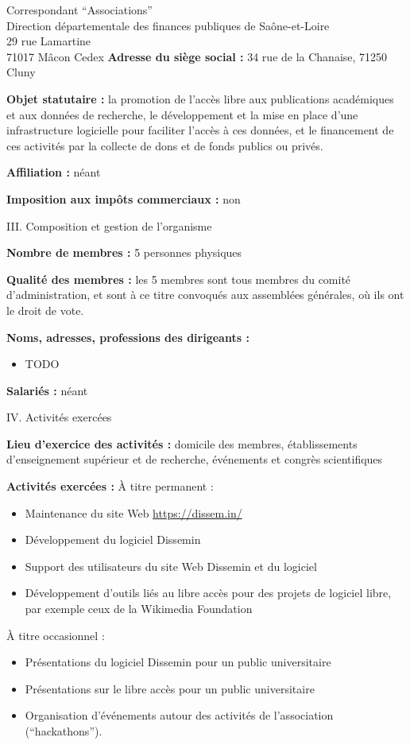 \documentclass[11pt]{lettre}
\begin{document}
\begin{letter}{Correspondant ``Associations''\\Direction départementale des finances publiques de Saône-et-Loire\\29 rue Lamartine\\71017 Mâcon Cedex}
  \textbf{Adresse du siège social :} 34 rue de la Chanaise, 71250 Cluny

  \textbf{Objet statutaire :} la promotion de l'accès libre aux publications académiques
  et aux données de recherche, le développement et la mise en place d'une
  infrastructure logicielle pour faciliter l'accès à ces données, et le
  financement de ces activités par la collecte de dons et de fonds publics ou
  privés.

  \textbf{Affiliation :} néant

  \textbf{Imposition aux impôts commerciaux :} non

  \bigskip
  {\Large III. Composition et gestion de l'organisme }

  \textbf{Nombre de membres :} 5 personnes physiques

  \textbf{Qualité des membres :} les 5 membres sont tous membres du comité
  d'administration, et sont à ce titre convoqués aux assemblées générales, où
  ils ont le droit de vote.

  \textbf{Noms, adresses, professions des dirigeants :}
  \begin{itemize}
    \item TODO
  \end{itemize}

  \textbf{Salariés :} néant

  \bigskip
  {\Large IV. Activités exercées}

  \textbf{Lieu d'exercice des activités :} domicile des membres, établissements
  d'enseignement supérieur et de recherche, événements et congrès scientifiques

  \textbf{Activités exercées :} À titre permanent :

  \begin{itemize}
    \item Maintenance du site Web \url{https://dissem.in/}
    \item Développement du logiciel Dissemin
    \item Support des utilisateurs du site Web Dissemin et du logiciel
    \item Développement d'outils liés au libre accès pour des projets de
      logiciel libre, par exemple ceux de la Wikimedia Foundation
  \end{itemize}

  À titre occasionnel :

  \begin{itemize}
    \item Présentations du logiciel Dissemin pour un public universitaire
    \item Présentations sur le libre accès pour un public universitaire
    \item Organisation d'événements autour des activités de l'association
      (``hackathons'').
  \end{itemize}


\end{letter}
\end{document}
